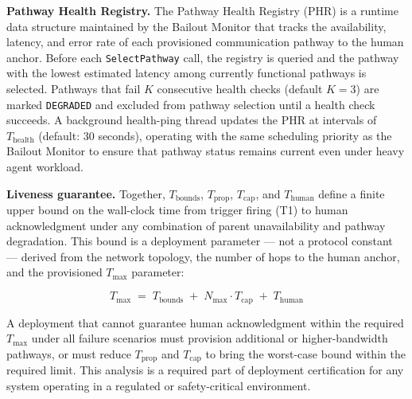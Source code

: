 \bigskip
\noindent\textbf{Pathway Health Registry.} The Pathway Health Registry (PHR) is a runtime data structure maintained by the Bailout Monitor that tracks the availability, latency, and error rate of each provisioned communication pathway to the human anchor. Before each \texttt{SelectPathway} call, the registry is queried and the pathway with the lowest estimated latency among currently functional pathways is selected. Pathways that fail $K$ consecutive health checks (default $K = 3$) are marked \texttt{DEGRADED} and excluded from pathway selection until a health check succeeds. A background health-ping thread updates the PHR at intervals of $T_{\text{health}}$ (default: 30 seconds), operating with the same scheduling priority as the Bailout Monitor to ensure that pathway status remains current even under heavy agent workload.

\bigskip
\noindent\textbf{Liveness guarantee.} Together, $T_{\text{bounds}}$, $T_{\text{prop}}$, $T_{\text{cap}}$, and $T_{\text{human}}$ define a finite upper bound on the wall-clock time from trigger firing (T1) to human acknowledgment under any combination of parent unavailability and pathway degradation. This bound is a deployment parameter — not a protocol constant — derived from the network topology, the number of hops to the human anchor, and the provisioned $T_{\max}$ parameter:

\begin{equation}
T_{\max} \;=\; T_{\text{bounds}} \;+\; N_{\max} \cdot T_{\text{cap}} \;+\; T_{\text{human}} \tag{T-max}
\end{equation}

A deployment that cannot guarantee human acknowledgment within the required $T_{\max}$ under all failure scenarios must provision additional or higher-bandwidth pathways, or must reduce $T_{\text{prop}}$ and $T_{\text{cap}}$ to bring the worst-case bound within the required limit. This analysis is a required part of deployment certification for any \bxthree{} system operating in a regulated or safety-critical environment.
